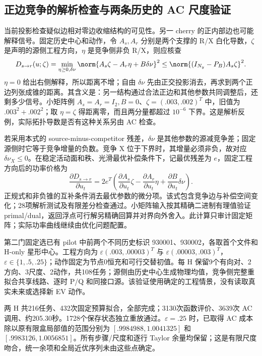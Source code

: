 \subsection{正边竞争的解析检查与两条历史的 AC 尺度验证}
\label{si:pairwise-check}
当前投影检查疑似边相对零边收缩结构的可见性。另一 cherry 的正内部边也可能解释信号。固定历史中心和动作，令 $A_s,A_r$ 分别是两个支撑的 R/X 白化导数，$\zeta$ 是声明的源侧工程方向，$\eta$ 是竞争侧非负 R/X，则应核查
\begin{equation}
 D_{s\to r}(u;\zeta)=\min_{\eta\ge0,\delta\nu}
 \norm{A_s\zeta-A_r\eta+B\delta\nu}^2
 \le \norm{(I_{N_y}-P_B)A_s\zeta}^2.
 \label{si:pairwise-cone}
\end{equation}
$\eta=0$ 给出右侧解释，所以距离不增；自由 $\delta\nu$ 先由正交投影消去，再求到两个正边列张成锥的距离。其含义是：另一结构通过合法正边和其他参数共同调整后，还剩多少信号。小矩阵例 $A_s=A_r=I_2,B=0$、$\zeta=(.003,.002)^T$ 中，旧值为 $.003^2+.002^2$；取 $\eta=\zeta$ 得距离零，而且两分量都超过 $10^{-6}$ 下界。这是解析反例，实际拓扑导数是否有这种关系另由 AC 检查。

若采用本式的 source-minus-competitor 残差，$\delta\nu$ 是其他参数的源减竞争差；固定源侧时它等于竞争增量的负数。竞争 X 位于下界时，其增量必须非负，故对应 $\delta\nu_X\le0$。在稳定活动面和秩、光滑最优补偿条件下，记最优残差为 $e$，固定工程方向后的功率价格为
\begin{equation}
 \frac{\partial D_{s\to r}}{\partial u_t}
 =2e^T\left(\frac{\partial A_s}{\partial u_t}\zeta
 -\frac{\partial A_r}{\partial u_t}\eta
 +\frac{\partial B}{\partial u_t}\delta\nu\right).
 \label{si:pairwise-price}
\end{equation}
正规式和非负锥的互补条件消去最优参数的微分项。该式包含竞争边与补偿空间变化；28项解析测试及有限差分检查通过。小矩阵输入按其精确二进制有理值验证 primal/dual，返回浮点可行解另精确回算并对界向外舍入。此计算只审计固定矩阵；实际功率曲线继续由优化问题配置。

第二门固定选已有 pilot 中前两个不同历史标识 930001、930002，各取首个文件和 H-only 星形中心。工程方向为 $\varepsilon(.003,.00003)^T$ 与 $\varepsilon(.00003,.003)^T$，$\varepsilon\in\{1,.5,.25\}$；动作固定为节点0恒充和可行交替初值。每 H 保留9个有向对、2方向、3尺度、2动作，共108任务；源侧由历史中心生成物理均值，竞争侧完整重拟合共享线路、逐时 P/Q 和同接口源。该验证使用确定的工程情景，没有读取真实未来或选择新 EV 动作。

两 H 共216任务、432次固定预算拟合，全部完成；3130次函数评价、3639次 AC 调用、约205.30秒。1728个保存状态独立重放通过。$\varepsilon=.25$ 时，已取得 AC 成本除以原有限盒局部值的范围分别为 $[.9984988,1.0041325]$ 和 $[.9983126,1.0056851]$。所有步骤/尺度和逐行 Taylor 余量均保留；这是有限尺度吻合，统一余项和全局近优序列未由这些点确定。

